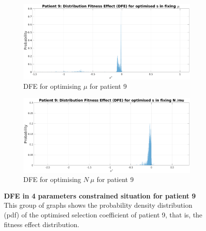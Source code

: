 \documentclass[12pt]{article}
\begin{document}
\begin{figure}[H]
    \ContinuedFloat
    
    \begin{subfigure}{1\textwidth}
        \includegraphics[width=\linewidth]{figures/patient/pt9/fixmu_DFE_s.eps}
        \caption{DFE for optimising $\mu$ for patient 9}
        \label{fig:subfig3}
    \end{subfigure}
    \hfill
    \begin{subfigure}{1\textwidth}
        \includegraphics[width=\linewidth]{figures/patient/pt9/pt9_fixNmu_DFE_s.eps}
        \caption{DFE for optimising $N\ \mu$ for patient 9}
        \label{fig:subfig4}
    \end{subfigure}
    
    \caption{\textbf{DFE in 4 parameters constrained situation for patient 9} This group of graphs shows the probability density distribution (pdf) of the optimised selection coefficient of patient 9, that is, the fitness effect distribution.}
    \label{fig:four_subfigs}
\end{figure}
\end{document}
